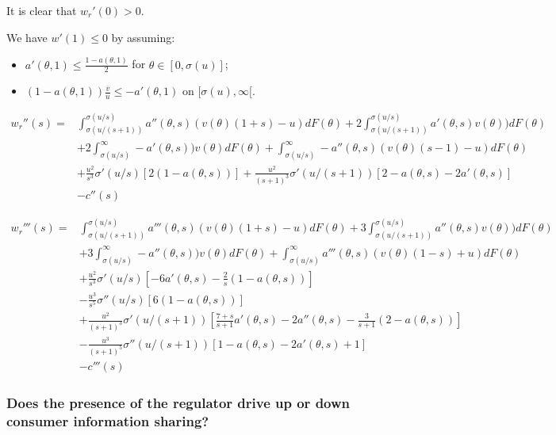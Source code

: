 \documentclass[a4paper,leqno]{article}%
\renewcommand{\t}{\theta}
\newcommand{\s}{\sigma}
\begin{document}
It is clear that $w_r'(0)>0$. 

We have $w'(1)\leq 0$  by assuming:

\begin{itemize}
    \item $a'(\t,1)\leq \frac{1-a(\t,1)}{2}$ for $\t\in[0,\s(u)]$;
    \item $(1-a(\t,1))\frac{\overline v}{u}\leq -a'(\t,1)$ on $[\s(u),\infty[$.
\end{itemize}


\begin{equation}
    \begin{aligned}
w_r''(s)=&\int_{\s(u/(s+1))}^{\s(u/s)}a''(\t,s)(v(\t)(1+s)-u)dF(\t)+2\int_{\s(u/(s+1))}^{\s(u/s)}a'(\t,s)v(\t))dF(\t)\\
    &+2\int_{\s(u/s)}^\infty -a'(\t,s))v(\t)dF(\t)+\int_{\s(u/s)}^\infty -a''(\t,s)(v(\t)(s-1)-u)dF(\t)\\
    &+\frac{u^2}{s^3}\s'(u/s)[2(1-a(\t,s))]+\frac{u^2}{(s+1)^3}\s'(u/(s+1))[2-a(\t,s)-2a'(\t,s)]\\
    &-c''(s)
\end{aligned}
\end{equation}


\begin{equation}
    \begin{aligned}
w_r'''(s)=&\int_{\s(u/(s+1))}^{\s(u/s)}a'''(\t,s)(v(\t)(1+s)-u)dF(\t)+3\int_{\s(u/(s+1))}^{\s(u/s)}a''(\t,s)v(\t))dF(\t)\\
    &+3\int_{\s(u/s)}^\infty -a''(\t,s))v(\t)dF(\t)+\int_{\s(u/s)}^\infty a'''(\t,s)(v(\t)(1-s)+u)dF(\t)\\
    &+\frac{u^2}{s^3}\s'(u/s)[-6a'(\t,s)-\frac{2}{s}(1-a(\t,s))]\\
    &-\frac{u^3}{s^5}\s''(u/s)[6(1-a(\t,s))]\\
    &+\frac{u^2}{(s+1)^3}\s'(u/(s+1))[\frac{7+s}{s+1}a'(\t,s)-2a''(\t,s)-\frac{3}{s+1}(2-a(\t,s))]\\
    &-\frac{u^3}{(s+1)^5}\s''(u/(s+1))[1-a(\t,s)-2a'(\t,s)+1]\\
    &-c'''(s)
\end{aligned}
\end{equation}





\subsubsection{Does the presence of the regulator drive up or down consumer information sharing?}
\end{document}
